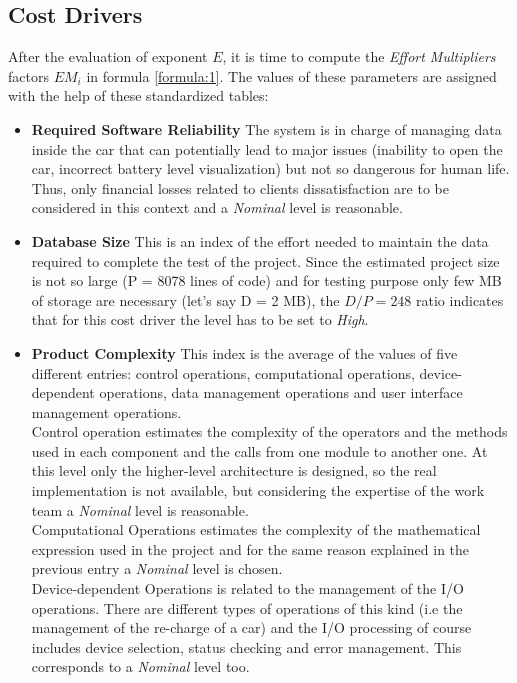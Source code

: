 \documentclass[11pt,a4paper]{report}
\begin{document}
\subsection{Cost Drivers}
After the evaluation of exponent $E$, it is time to compute the \textit{Effort Multipliers} factors $EM_i$ in formula \ref{formula:1}. The values of these parameters are assigned with the help of these standardized tables:
\begin{itemize}
	\item \textbf{Required Software Reliability}
The system is in charge of managing data inside the car that can potentially lead to major issues (inability to open the car, incorrect battery level visualization) but not so dangerous for human life. Thus, only financial losses related to clients dissatisfaction are to be considered in this context and a \textit{Nominal} level is reasonable. 
	\item \textbf{Database Size}
This is an index of the effort needed to maintain the data required to complete the test of the project. Since the estimated project size is not so large (P = 8078 lines of code) and for testing purpose only few MB of storage are necessary (let's say D = 2 MB),  the $D/P = 248$  ratio indicates that for this cost driver the level has to be set to \textit{High}.
	\item \textbf{Product Complexity}
This index is the average of the values of five different entries: control operations, computational operations, device-dependent operations, data management operations and user interface management operations.\\
Control operation estimates the complexity of the operators and the methods used in each component and the calls from one module to another one. At this level only the higher-level architecture is designed, so the real implementation is not available, but considering the expertise of the work team a \textit{Nominal} level is reasonable.\\Computational Operations estimates the complexity of the mathematical expression used in the project and for the same reason explained in the previous entry a \textit{Nominal} level is chosen.\\
Device-dependent Operations is related to the management of the I/O operations. There are different types of operations of this kind (i.e the management of the re-charge of a car) and the I/O processing of course includes device selection, status checking and error management. This corresponds to a \textit{Nominal} level too.\\

\end{itemize}
\end{document}
